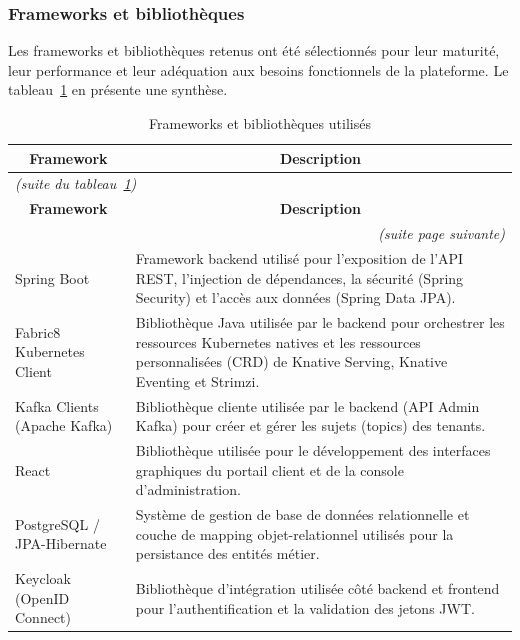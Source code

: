 \subsubsection{Frameworks et bibliothèques}

Les frameworks et bibliothèques retenus ont été sélectionnés pour leur maturité, leur performance et leur adéquation aux besoins fonctionnels de la plateforme. Le tableau~\ref{tab:frameworks} en présente une synthèse.

\renewcommand{\arraystretch}{1.3}
\begin{center}
\begingroup
\centering
\renewcommand{\arraystretch}{1.2}
\begin{longtable}{|m{3cm}|m{11.5cm}|}
\caption{Frameworks et bibliothèques utilisés}
\label{tab:frameworks}\\
\hline
\multicolumn{1}{|c|}{\textbf{Framework}} & \multicolumn{1}{c|}{\textbf{Description}} \\
\hline
\endfirsthead

\multicolumn{2}{l}{\small\itshape (suite du tableau~\ref{tab:frameworks})}\\
\hline
\multicolumn{1}{|c|}{\textbf{Framework}} & \multicolumn{1}{c|}{\textbf{Description}} \\
\hline
\endhead

\hline
\multicolumn{2}{r}{\small\itshape (suite page suivante)}\\
\endfoot

\hline
\endlastfoot

Spring Boot & Framework backend utilisé pour l'exposition de l'API REST, l'injection de dépendances, la sécurité (Spring Security) et l'accès aux données (Spring Data JPA). \\
\hline
Fabric8 Kubernetes Client & Bibliothèque Java utilisée par le backend pour orchestrer les ressources Kubernetes natives et les ressources personnalisées (CRD) de Knative Serving, Knative Eventing et Strimzi. \\
\hline
Kafka Clients (Apache Kafka) & Bibliothèque cliente utilisée par le backend (API Admin Kafka) pour créer et gérer les sujets (topics) des tenants. \\
\hline
React & Bibliothèque utilisée pour le développement des interfaces graphiques du portail client et de la console d'administration. \\
\hline
PostgreSQL / JPA-Hibernate & Système de gestion de base de données relationnelle et couche de mapping objet-relationnel utilisés pour la persistance des entités métier. \\
\hline
Keycloak (OpenID Connect) & Bibliothèque d'intégration utilisée côté backend et frontend pour l'authentification et la validation des jetons JWT. \\
\hline
\end{longtable}
\endgroup
\end{center}

